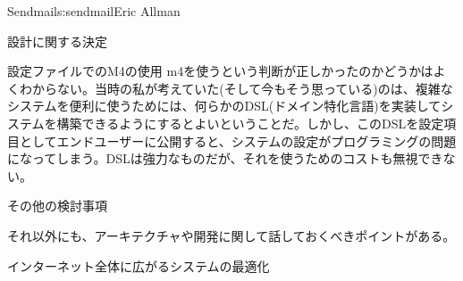 \begin{aosachapter}{Sendmail}{s:sendmail}{Eric Allman}
\begin{aosasect1}{設計に関する決定}
\begin{aosasect2}{設定ファイルでのM4の使用}
m4を使うという判断が正しかったのかどうかはよくわからない。当時の私が考えていた(そして今もそう思っている)のは、複雑なシステムを便利に使うためには、何らかのDSL(ドメイン特化言語)を実装してシステムを構築できるようにするとよいということだ。しかし、このDSLを設定項目としてエンドユーザーに公開すると、システムの設定がプログラミングの問題になってしまう。DSLは強力なものだが、それを使うためのコストも無視できない。

\end{aosasect2}

\end{aosasect1}

\begin{aosasect1}{その他の検討事項}

それ以外にも、アーキテクチャや開発に関して話しておくべきポイントがある。

\begin{aosasect2}{インターネット全体に広がるシステムの最適化}


\end{aosasect2}
\end{aosasect1}
\end{aosachapter}

